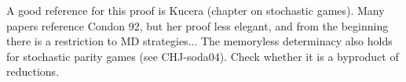 A good reference for this proof is Kucera (chapter on stochastic
  games). Many papers reference Condon 92, but her proof less elegant,
  and from the beginning there is a restriction to MD
  strategies... The memoryless determinacy also holds for stochastic
  parity games (see CHJ-soda04). Check whether it is a byproduct of
  reductions.